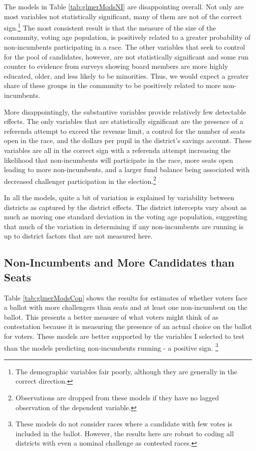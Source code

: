 The models in Table \ref{tab:glmerModsNI} are disappointing overall. Not only are 
most variables not statistically significant, many of them are not of the correct 
sign.\footnote{The demographic variables fair poorly, although they are generally in the 
correct direction.} The most consistent result is that the measure of the size 
of the community, voting age population, is positively related to a greater probability 
of non-incumbents participating in a race. The other variables that seek to control 
for the pool of candidates, however, are not statistically significant and some run 
counter to evidence from surveys showing board members are more highly educated, 
older, and less likely to be minorities. Thus, we would expect a greater share 
of these groups in the community to be positively related to more non-incumbents. 

More disappointingly, the substantive variables provide relatively few detectable 
effects. The only variables that are statistically significant are the presence 
of a referenda attempt to exceed the revenue limit, a control for the number of 
seats open in the race, and the dollars per pupil in the district's savings account. 
These variables are all in the correct sign with a referenda attempt increasing 
the likelihood that non-incumbents will participate in the race, more seats open 
leading to more non-incumbents, and a larger fund balance being associated with 
decreased challenger participation in the election.\footnote{Observations are 
dropped from these models if they have no lagged observation of the dependent 
variable.}

In all the models, quite a bit of variation is explained by variability between 
districts as captured by the district effects. The district intercepts vary about 
as much as moving one standard deviation in the voting age population, suggesting 
that much of the variation in determining if any non-incumbents are running is up 
to district factors that are not measured here. 

\subsection{Non-Incumbents and More Candidates than Seats}

Table \ref{tab:glmerModsCon} shows the results for estimates of whether voters 
face a ballot with more challengers than seats and at least one non-incumbent 
on the ballot. This presents a better measure of what voters might think of as 
contestation because it is measuring the presence of an actual choice on the ballot 
for voters. These models are better supported by the variables I selected to 
test than the models predicting non-incumbents running - a positive sign. 
\footnote{These models do not consider races where a candidate with few votes is 
included in the ballot. However, the results here are robust to coding all districts 
with even a nominal challenge as contested races.}

